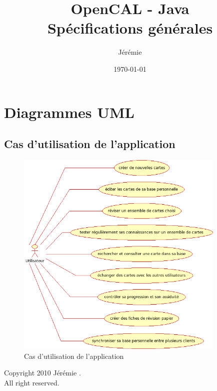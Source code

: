 \documentclass[pdftex,a4paper,11pt]{article}
\begin{document}
\title{OpenCAL - Java\\\medskip
       Spécifications générales}
\author{Jérémie }
\date{\today}

\maketitle


\section{Diagrammes UML}
\subsection{Cas d'utilisation de l'application}

\begin{figure}[htbp]
    \centering
    \includegraphics[width=10cm]{diagrams/use_case_diagram}
    \caption{Cas d'utilisation de l'application}
    \label{use_case}
\end{figure}


\clearpage

\begin{center}
    Copyright \textcopyright{} 2010 Jérémie .\\
    All right reserved.
\end{center}
\end{document}
